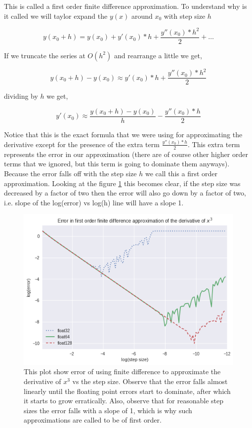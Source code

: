 This is called a  first order finite difference approximation. To understand why is it called we will taylor expand the $y(x)$ around $x_0$ with step size $h$

\begin{equation}
    y(x_0 + h) = y(x_0) + y'(x_0)*h +\frac{y''(x_0)*h^2}{2} + \dots
\end{equation}

If we truncate the series at $O(h^2)$ and rearrange a little we get,

\begin{equation}
    y(x_0 + h) - y(x_0) \approx y'(x_0)*h +\frac{y''(x_0)*h^2}{2}
\end{equation}

dividing by $h$ we get,

\begin{equation}
    y'(x_0)  \approx \frac{y(x_0 + h) - y(x_0)}{h} - \frac{y''(x_0)*h}{2}
\end{equation}

Notice that this is the exact formula that we were using for approximating the derivative except for the presence of the extra term $\frac{y''(x_0)*h}{2}$. This extra term represents the error in our approximation (there are of course other higher order terms that we ignored, but this term is going to dominate them anyways). Because the error falls off with the step size $h$ we call this a first order approximation. Looking at the figure \ref{fig:x^3_error_order1} this becomes clear, if the step size was decreased by a factor of two then the error will also go down by a factor of two, i.e. slope of the log(error) vs log(h) line will have a slope 1.

\begin{figure}[hbt!]
    \centering
    \includegraphics[width=\textwidth]{images/x^3_error_order1.png}
    \caption{This plot show error of using finite difference to approximate the derivative of $x^3$ vs the step size. Observe that the error falls almost linearly until the floating point errors start to dominate, after which it starts to grow erratically. Also, observe that for reasonable step sizes the error falls with a slope of 1, which is why such approximations are called to be of first order. }\label{fig:x^3_error_order1}
\end{figure}

